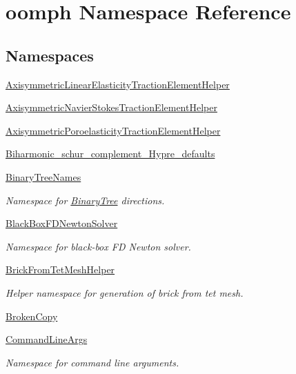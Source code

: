 \hypertarget{namespaceoomph}{}\section{oomph Namespace Reference}
\label{namespaceoomph}
\subsection*{Namespaces}
\begin{DoxyCompactItemize}
\item 
 \hyperlink{namespaceoomph_1_1AxisymmetricLinearElasticityTractionElementHelper}{Axisymmetric\+Linear\+Elasticity\+Traction\+Element\+Helper}
\item 
 \hyperlink{namespaceoomph_1_1AxisymmetricNavierStokesTractionElementHelper}{Axisymmetric\+Navier\+Stokes\+Traction\+Element\+Helper}
\item 
 \hyperlink{namespaceoomph_1_1AxisymmetricPoroelasticityTractionElementHelper}{Axisymmetric\+Poroelasticity\+Traction\+Element\+Helper}
\item 
 \hyperlink{namespaceoomph_1_1Biharmonic__schur__complement__Hypre__defaults}{Biharmonic\+\_\+schur\+\_\+complement\+\_\+\+Hypre\+\_\+defaults}
\item 
 \hyperlink{namespaceoomph_1_1BinaryTreeNames}{Binary\+Tree\+Names}
\begin{DoxyCompactList}\small\item\em Namespace for \hyperlink{classoomph_1_1BinaryTree}{Binary\+Tree} directions. \end{DoxyCompactList}\item 
 \hyperlink{namespaceoomph_1_1BlackBoxFDNewtonSolver}{Black\+Box\+F\+D\+Newton\+Solver}
\begin{DoxyCompactList}\small\item\em Namespace for black-\/box FD Newton solver. \end{DoxyCompactList}\item 
 \hyperlink{namespaceoomph_1_1BrickFromTetMeshHelper}{Brick\+From\+Tet\+Mesh\+Helper}
\begin{DoxyCompactList}\small\item\em Helper namespace for generation of brick from tet mesh. \end{DoxyCompactList}\item 
 \hyperlink{namespaceoomph_1_1BrokenCopy}{Broken\+Copy}
\item 
 \hyperlink{namespaceoomph_1_1CommandLineArgs}{Command\+Line\+Args}
\begin{DoxyCompactList}\small\item\em Namespace for command line arguments. \end{DoxyCompactList}\item 

\end{DoxyCompactItemize}
